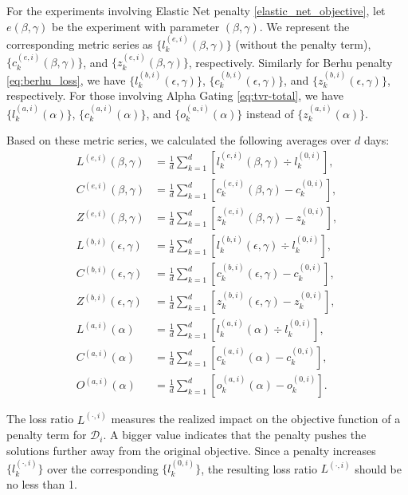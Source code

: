 \documentclass[11pt, letterpaper]{article}
\begin{document}
For the experiments involving Elastic Net penalty \eqref{elastic_net_objective}, let $e(\beta, \gamma)$ be the experiment with
parameter $(\beta, \gamma)$. We represent the corresponding metric series as $\{l_k^{(e,i)}(\beta,\gamma)\}$ (without the
penalty term), $\{c_k^{(e,i)}(\beta,\gamma)\}$, and $\{z_k^{(e,i)}(\beta,\gamma)\}$, respectively. Similarly for Berhu penalty
\eqref{eq:berhu_loss}, we have $\{l_k^{(b,i)}(\epsilon,\gamma)\}$, $\{c_k^{(b,i)}(\epsilon,\gamma)\}$, and
$\{z_k^{(b,i)}(\epsilon,\gamma)\}$, respectively. For those involving Alpha Gating \eqref{eq:tvr-total}, we have
$\{l_k^{(a,i)}(\alpha)\}$, $\{c_k^{(a,i)}(\alpha)\}$, and $\{o_k^{(a,i)}(\alpha)\}$ instead of $\{z_k^{(a,i)}(\alpha)\}$.

Based on these metric series, we calculated the following averages over $d$ days:
\begin{align*}
	L^{(e,i)}(\beta,\gamma) &= \frac{1}{d}{\sum_{k=1}^d{\left[l_k^{(e,i)}(\beta,\gamma) \div l_k^{(0,i)}\right]}}, \\
	C^{(e,i)}(\beta,\gamma) &= \frac{1}{d}{\sum_{k=1}^d{\left[c_k^{(e,i)}(\beta,\gamma) - c_k^{(0,i)}\right]}}, \\
	Z^{(e,i)}(\beta,\gamma) &= \frac{1}{d}{\sum_{k=1}^d{\left[z_k^{(e,i)}(\beta,\gamma) - z_k^{(0,i)}\right]}}, \\
	L^{(b,i)}(\epsilon,\gamma) &= \frac{1}{d}{\sum_{k=1}^d{\left[l_k^{(b,i)}(\epsilon,\gamma) \div l_k^{(0,i)}\right]}}, \\
	C^{(b,i)}(\epsilon,\gamma) &= \frac{1}{d}{\sum_{k=1}^d{\left[c_k^{(b,i)}(\epsilon,\gamma) - c_k^{(0,i)}\right]}}, \\
	Z^{(b,i)}(\epsilon,\gamma) &= \frac{1}{d}{\sum_{k=1}^d{\left[z_k^{(b,i)}(\epsilon,\gamma) - z_k^{(0,i)}\right]}}, \\
	L^{(a,i)}(\alpha) &= \frac{1}{d}{\sum_{k=1}^d{\left[l_k^{(a,i)}(\alpha) \div l_k^{(0,i)}\right]}}, \\
	C^{(a,i)}(\alpha) &= \frac{1}{d}{\sum_{k=1}^d{\left[c_k^{(a,i)}(\alpha) - c_k^{(0,i)}\right]}}, \\
	O^{(a,i)}(\alpha) &= \frac{1}{d}{\sum_{k=1}^d{\left[o_k^{(a,i)}(\alpha) - o_k^{(0,i)}\right]}}.
\end{align*}

The loss ratio $L^{(\cdot,i)}$ measures the realized impact on the objective function of a penalty term for $\mathcal{D}_i$. A
bigger value indicates that the penalty pushes the solutions further away from the original objective. Since a penalty increases
$\{l_k^{(\cdot,i)}\}$ over the corresponding $\{l_k^{(0,i)}\}$, the resulting loss ratio $L^{(\cdot,i)}$ should be no less than
1.
\end{document}
